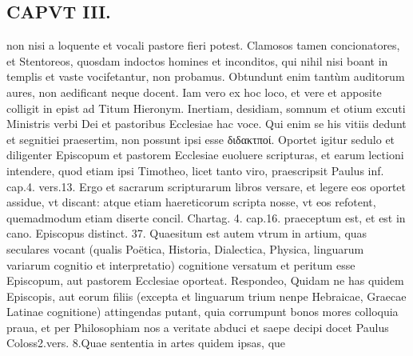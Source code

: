 \documentclass{article}
\begin{document}
\begin{pages}
\section*{CAPVT  III. }
\marginpar{[ p.17 ]}\pstart non nisi a loquente et vocali pastore fieri potest. Clamosos tamen concionatores, et Stentoreos, quosdam indoctos homines et inconditos, qui nihil nisi boant in templis et vaste vocifetantur, non probamus. Obtundunt enim tantùm auditorum aures, non aedificant neque docent.  \pend\pstart Iam vero ex hoc loco, et vere et apposite colligit in epist ad Titum Hieronym. Inertiam, desidiam, somnum et otium excuti Ministris verbi Dei et pastoribus Ecclesiae hac voce. Qui enim se his vitiis dedunt et segnitiei praesertim, non possunt ipsi esse διδακτποί. Oportet igitur sedulo et diligenter Episcopum et pastorem Ecclesiae euoluere scripturas, et earum lectioni intendere, quod etiam ipsi Timotheo, licet tanto viro, praescripsit Paulus inf. cap.4. vers.13. Ergo et sacrarum scripturarum libros versare, et legere eos oportet assidue, vt discant: atque etiam haereticorum scripta nosse, vt eos refotent, quemadmodum etiam diserte concil. Chartag. 4. cap.16. praeceptum est, et est in cano. Episcopus distinct. 37.  \pend\pstart Quaesitum est autem vtrum in artium, quas seculares vocant (qualis Poëtica, Historia, Dialectica, Physica, linguarum variarum cognitio et interpretatio) cognitione versatum et peritum esse Episcopum, aut pastorem Ecclesiae oporteat. Respondeo, Quidam ne has quidem Episcopis, aut eorum filiis (excepta et linguarum trium nenpe Hebraicae, Graecae Latinae cognitione) attingendas putant, quia corrumpunt bonos mores colloquia praua, et per Philosophiam nos a veritate abduci et saepe decipi docet Paulus Coloss2.vers. 8.Quae sententia in artes quidem ipsas, que  \pend

\end{pages}
\end{document}
